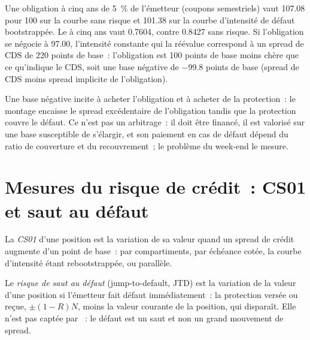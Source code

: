 \begin{example}\label{ex:rc:reduced-form-credit:bond}
Une obligation à cinq ans de 5~\% de l'émetteur (coupons semestriels) vaut 107.08 pour 100 sur la
courbe sans risque et 101.38 sur la courbe d'intensité de défaut bootstrappée. Le  à
cinq ans vaut 0.7604, contre 0.8427 sans risque. Si l'obligation se négocie à 97.00, l'intensité
constante qui la réévalue correspond à un spread de CDS de 220 points de base~: l'obligation
est 100 points de base moins chère que ce qu'indique le CDS, soit une base négative de
$-99.8$ points de base (spread de CDS moins spread implicite de l'obligation).
\end{example}

Une base négative incite à acheter l'obligation et à acheter de la protection~: le montage encaisse
le spread excédentaire de l'obligation tandis que la protection couvre le défaut. Ce n'est pas un arbitrage~: il
doit être financé, il est valorisé sur une base susceptible de s'élargir, et son paiement en cas de défaut dépend
du ratio de couverture et du recouvrement~; le problème du week-end le mesure.

\section{Mesures du risque de crédit~: CS01 et saut au défaut}

\begin{definition}[CS01]\label{def:rc:reduced-form-credit:cs01}
La \emph{CS01} d'une position est la variation de sa valeur quand un spread de
crédit augmente d'un point de base~: par compartiments, par échéance cotée, la courbe
d'intensité étant rebootstrappée, ou parallèle.
\end{definition}

\begin{definition}\label{def:rc:reduced-form-credit:jtd}
Le \emph{risque de saut au défaut} (jump-to-default, JTD) est la variation de la
valeur d'une position si l'émetteur fait défaut immédiatement~: la protection versée ou reçue,
$\pm(1-R)N$, moins la valeur courante de la position, qui disparaît. Elle n'est pas captée par
~: le défaut est un saut et non un grand mouvement de spread.
\end{definition}

